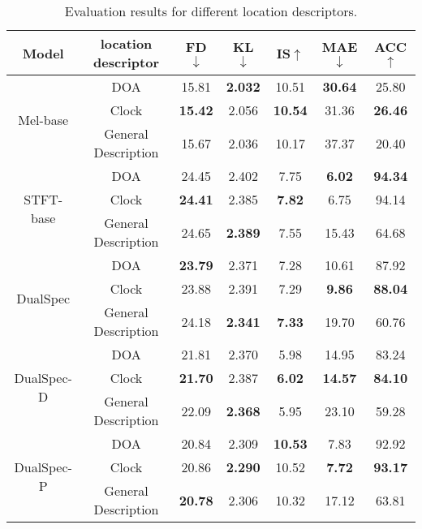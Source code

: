 \documentclass{IEEEtran}
\begin{document}
\begin{table*}[ht]
\centering
\caption{Evaluation results for different location descriptors.}
\setlength{\tabcolsep}{6.7mm}
\begin{tabular}{c c c c c c c}
\toprule
\textbf{Model} & \textbf{location descriptor} & \textbf{FD$\downarrow$} & \textbf{KL$\downarrow$} & \textbf{IS$\uparrow$} & \textbf{MAE$\downarrow$} & \textbf{ACC$\uparrow$} \\
\midrule
\multirow{3}{*}{Mel-base} & DOA & 15.81 & \textbf{2.032} & 10.51 & \textbf{30.64} & 25.80 \\
& Clock & \textbf{15.42} & 2.056 & \textbf{10.54} & 31.36 & \textbf{26.46} \\
& General Description & 15.67 & 2.036 & 10.17 & 37.37 & 20.40 \\
\midrule
\multirow{3}{*}{STFT-base} & DOA & 24.45 & 2.402 & 7.75 & \textbf{6.02} & \textbf{94.34} \\
& Clock & \textbf{24.41} & 2.385 & \textbf{7.82} & 6.75 & 94.14 \\
& General Description & 24.65 & \textbf{2.389} & 7.55 & 15.43 & 64.68 \\
\midrule
\multirow{3}{*}{DualSpec} & DOA & \textbf{23.79} & 2.371 & 7.28 & 10.61 & 87.92 \\
& Clock & 23.88 & 2.391 & 7.29 & \textbf{9.86} & \textbf{88.04} \\
& General Description & 24.18 & \textbf{2.341} & \textbf{7.33} & 19.70 & 60.76 \\
\midrule
\multirow{3}{*}{DualSpec-D} & DOA & 21.81 & 2.370 & 5.98 & 14.95 & 83.24 \\
& Clock & \textbf{21.70} & 2.387 & \textbf{6.02} & \textbf{14.57} & \textbf{84.10} \\
& General Description & 22.09 & \textbf{2.368} & 5.95 & 23.10 & 59.28 \\
\midrule
\multirow{3}{*}{DualSpec-P} & DOA & 20.84 & 2.309 & \textbf{10.53} & 7.83 & 92.92 \\
& Clock & 20.86 &  \textbf{2.290} & 10.52 & \textbf{7.72} & \textbf{93.17} \\
& General Description & \textbf{20.78} & 2.306 & 10.32 & 17.12 & 63.81 \\
\bottomrule
\end{tabular}
\label{tab:abla}
\end{table*}
\end{document}
